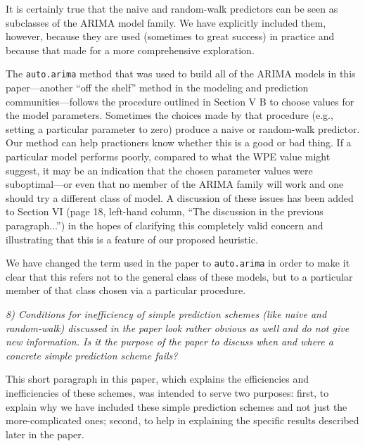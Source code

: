 \documentclass[12pt]{article}
\begin{document}
It is certainly true that the naive and random-walk predictors can be
seen as subclasses of the ARIMA model family.  We have explicitly
included them, however, because they are used (sometimes to great
success) in practice and because that made for a more comprehensive
exploration.

The {\tt auto.arima} method that was used to build all of the ARIMA
models in this paper---another ``off the shelf'' method in the
modeling and prediction communities---follows the procedure outlined
in Section V B to choose values for the model parameters.  Sometimes
the choices made by that procedure (e.g., setting a particular
parameter to zero) produce a naive or random-walk predictor.  Our
method can help practioners know whether this is a good or bad thing.
If a particular model performs poorly, compared to what the WPE value
might suggest, it may be an indication that the chosen parameter
values were suboptimal---or even that no member of the ARIMA family
will work and one should try a different class of model.  A discussion
of these issues has been added to Section VI (page 18, left-hand
column, ``The discussion in the previous paragraph...'') in the hopes
of clarifying this completely valid concern and illustrating that this
is a feature of our proposed heuristic.


We have changed the term used in the paper to {\tt auto.arima} in
order to make it clear that this refers not to the general class of
these models, but to a particular member of that class chosen via a
particular procedure.

\smallskip

\emph{8) Conditions for inefficiency of simple prediction schemes
  (like naive and random-walk) discussed in the paper look rather
  obvious as well and do not give new information. Is it the purpose
  of the paper to discuss when and where a concrete simple prediction
  scheme fails?}

This short paragraph in this paper, which explains the efficiencies
and inefficiencies of these schemes, was intended to serve two
purposes: first, to explain why we have included these simple
prediction schemes and not just the more-complicated ones; second, to
help in explaining the specific results described later in the paper.

\smallskip
\end{document}
